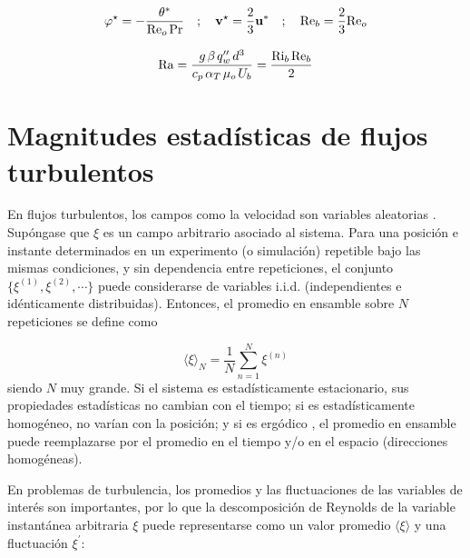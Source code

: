 \begin{equation*}
\varphi^{\star} = -  \frac{\theta^*}{\text{Re}_o \hspace{0.5mm} \text{Pr}}  \quad ; \quad \mathbf{v^{\star}} = \frac{2}{3} \mathbf{u^*} \quad ; \quad \text{Re}_b = \frac{2}{3} \text{Re}_o
\end{equation*}  

\begin{equation}
\text{Ra} = \frac{g \hspace{0.5mm} \beta \hspace{0.5mm} q''_w \hspace{0.5mm} d^3}{c_p \hspace{0.5mm} \alpha_{T} \hspace{0.5mm} \mu_o \hspace{0.5mm} U_b} = \frac{\text{Ri}_b \hspace{0.5mm} \text{Re}_b}{2} 
\label{eq:Rayleigh}
\end{equation} 


\section{Magnitudes estadísticas de flujos turbulentos} \label{sec:mag-stat}

En flujos turbulentos, los campos como la velocidad son variables aleatorias \linebreak \cite{pope2001turbulent}. Supóngase que $\xi$ es un campo arbitrario asociado al sistema. Para una posición e instante determinados en un experimento (o simulación) repetible bajo las mismas condiciones, y sin dependencia entre repeticiones, el conjunto $\lbrace \xi^{(1)}, \xi^{(2)}, \cdots \rbrace$ puede considerarse de variables i.i.d. (independientes e idénticamente distribuidas). Entonces, el promedio en ensamble sobre $N$ repeticiones se define como 

\begin{equation*}
\langle \xi \rangle_N = \frac{1}{N} \sum^N_{n=1} \xi^{(n)} 
\end{equation*}
siendo $N$ muy grande. Si el sistema es estadísticamente estacionario, sus propiedades estadísticas no cambian con el tiempo; si es estadísticamente homogéneo, no varían con la posición; y si es ergódico \cite{moser2003}, el promedio en ensamble puede reemplazarse por el promedio en el tiempo y/o en el espacio (direcciones homogéneas). 

En problemas de turbulencia, los promedios y las fluctuaciones de las variables de interés son importantes, por lo que la descomposición de Reynolds \cite{pope2001turbulent, kundu} de la variable instantánea arbitraria $\xi$ puede representarse como un valor promedio $\langle \xi \rangle$ y una fluctuación $\xi^{\prime}$:

